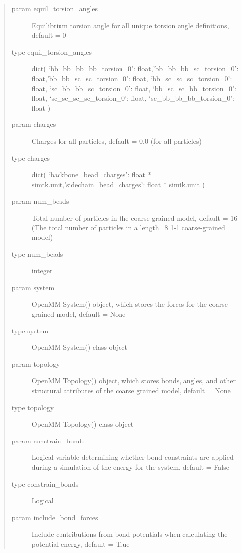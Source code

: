 \documentclass[letterpaper,12pt,english,openany,oneside]{sphinxmanual}
\begin{document}
\begin{fulllineitems}
\begin{description}
\begin{quote}
\begin{description}
\item[{param equil\_torsion\_angles}] \leavevmode
Equilibrium torsion angle for all unique torsion angle definitions, default = 0

\item[{type equil\_torsion\_angles}] \leavevmode
dict( ‘bb\_bb\_bb\_bb\_torsion\_0’: float,’bb\_bb\_bb\_sc\_torsion\_0’: float,’bb\_bb\_sc\_sc\_torsion\_0’: float, ‘bb\_sc\_sc\_sc\_torsion\_0’: float, ‘sc\_bb\_bb\_sc\_torsion\_0’: float, ‘bb\_sc\_sc\_bb\_torsion\_0’: float, ‘sc\_sc\_sc\_sc\_torsion\_0’: float, ‘sc\_bb\_bb\_bb\_torsion\_0’: float )

\item[{param charges}] \leavevmode
Charges for all particles, default = 0.0 (for all particles)

\item[{type charges}] \leavevmode
dict( ‘backbone\_bead\_charges’: float * simtk.unit,’sidechain\_bead\_charges’: float * simtk.unit )

\item[{param num\_beads}] \leavevmode
Total number of particles in the coarse grained model, default = 16 (The total number of particles in a length=8 1-1 coarse-grained model)

\item[{type num\_beads}] \leavevmode
integer

\item[{param system}] \leavevmode
OpenMM System() object, which stores the forces for the coarse grained model, default = None

\item[{type system}] \leavevmode
OpenMM System() class object

\item[{param topology}] \leavevmode
OpenMM Topology() object, which stores bonds, angles, and other structural attributes of the coarse grained model, default = None

\item[{type topology}] \leavevmode
OpenMM Topology() class object

\item[{param constrain\_bonds}] \leavevmode
Logical variable determining whether bond constraints are applied during a simulation of the energy for the system, default = False

\item[{type constrain\_bonds}] \leavevmode
Logical

\item[{param include\_bond\_forces}] \leavevmode
Include contributions from bond potentials when calculating the potential energy, default = True


\end{description}
\end{quote}
\end{description}
\end{fulllineitems}
\end{document}
